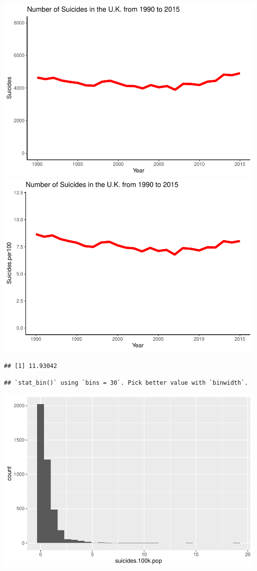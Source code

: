 \documentclass[11pt,]{article}
\begin{document}
\includegraphics{An-Analysis-of-Suicide-Data_files/figure-latex/unnamed-chunk-1-3.pdf}
\includegraphics{An-Analysis-of-Suicide-Data_files/figure-latex/unnamed-chunk-1-4.pdf}

\begin{verbatim}
## [1] 11.93042
\end{verbatim}

\begin{verbatim}
## `stat_bin()` using `bins = 30`. Pick better value with `binwidth`.
\end{verbatim}

\includegraphics{An-Analysis-of-Suicide-Data_files/figure-latex/unnamed-chunk-1-5.pdf}
\end{document}
